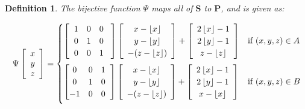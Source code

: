 \documentclass[]{article}
\newtheorem{Def}{Definition}[subsection]
\begin{document}
\begin{Def}
The bijective function $\Psi$ maps all of $\mathbf{S}$ to $\mathbf P$, and is given as:
\end{Def}

\begin{equation}
\Psi\left[\begin{array}{c}
	x\\y\\z
\end{array}\right] 
= 
\begin{cases}
	\left[ \hspace{2mm} \begin{matrix}
		1 & 0 & 0 \\
		0 & 1 & 0 \\
		0 & 0 & 1
	\end{matrix}\hspace{3mm}\right]

	\left[\begin{array}{c}
	x - \left\lfloor x \right\rfloor
	\\ y- \left\lfloor y \right\rfloor
	\\ -(z - \left\lfloor z \right\rfloor)
	\end{array} \right]
	+
	\left[\begin{array}{c}
		2 \left\lfloor x \right\rfloor - 1
		\\ 2\left\lfloor y \right\rfloor - 1
		\\ z - \left\lfloor z \right\rfloor
	\end{array} \right]
		& \text{if } (x,y,z)\in A	\vspace{2mm}
	\\
		
		
	\left[ \begin{matrix}
	0 & 0 & 1 \\
	0 & 1 & 0 \\
	-1 & 0 & 0
	\end{matrix}\hspace{2mm}\right]
	\left[\begin{array}{c}
		x - \left\lfloor x \right\rfloor
		\\ y- \left\lfloor y \right\rfloor
		\\ -(z - \left\lfloor z \right\rfloor)
		\end{array} \right]
	+
		\left[\begin{array}{c}
			2 \left\lfloor x \right\rfloor - 1
			\\ 2\left\lfloor y \right\rfloor - 1
			\\ x - \left\lfloor x \right\rfloor
		\end{array} \right]
			& \text{if } (x,y,z)\in B	\vspace{2mm}
	\\
	

\end{cases}
\end{equation}
\end{document}
